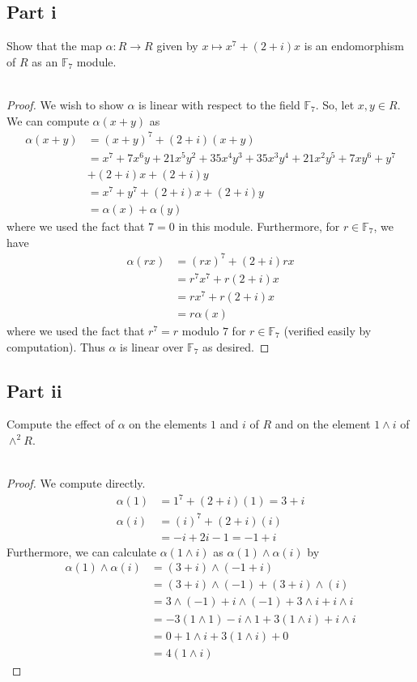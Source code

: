 \documentclass[12pt,reqno]{amsart}
\begin{document}
\subsection*{Part i}
Show that the map $\alpha:R\to R$ given by $x\mapsto x^7 + (2+i)x$ is an
endomorphism of $R$ as an $\mathbb{F}_7$ module.
\\
\\
\begin{proof}
    We wish to show $\alpha$ is linear with respect to the field $\mathbb{F}_7$.
    So, let $x,y\in R$. We can compute $\alpha(x+y)$ as
    \[
\begin{aligned}
    \alpha(x+y) &= (x+y)^7 + (2+i)(x+y)\\
    &= x^7+7x^6y+21x^5y^2+35x^4y^3+35x^3y^4+21x^2y^5+7xy^6+y^7\\
    &+(2+i)x+(2+i)y\\
    &= x^7 + y^7 + (2+i)x+(2+i)y\\
    &=\alpha(x) + \alpha(y)
\end{aligned}
    \]
    where we used the fact that $7=0$ in this module. Furthermore, for
    $r\in\mathbb{F}_7$, we have
    \[
\begin{aligned}
    \alpha(rx) &= (rx)^7 + (2+i)rx\\
    &= r^7x^7 + r(2+i)x\\
    &= rx^7 + r(2+i)x\\
    &=r\alpha(x)
\end{aligned}
    \]
    where we used the fact that $r^7 = r$ modulo $7$ for $r\in \mathbb{F}_7$
    (verified easily by computation). Thus $\alpha$ is linear over
    $\mathbb{F}_7$ as desired.
\end{proof}

\subsection*{Part ii}
Compute the effect of $\alpha$ on the elements $1$ and $i$ of $R$ and on the
element $1\wedge i$ of $\wedge^2R$.
\\
\\
\begin{proof}
    We compute directly.
    \[
        \begin{aligned}
            \alpha(1) &= 1^7 + (2+i)(1) = 3+i\\
            \alpha(i) &= (i)^7 + (2+i)(i)\\
            &= -i + 2i-1 = -1 +i
    \end{aligned}
    \]
    Furthermore, we can calculate $\alpha(1\wedge i)$ as $\alpha(1)\wedge
    \alpha(i)$ by
    \[
\begin{aligned}
    \alpha(1)\wedge\alpha(i) &= (3+i)\wedge(-1+i)\\
    &=(3+i)\wedge(-1) + (3+i)\wedge(i)\\
    &= 3\wedge(-1) + i\wedge(-1) + 3\wedge i + i\wedge i\\
    &= -3(1\wedge 1) -i\wedge 1 + 3(1\wedge i) + i\wedge i\\
    &= 0 + 1\wedge i + 3(1\wedge i) + 0\\
    &= 4(1\wedge i)
\end{aligned}
    \]
\end{proof}
\end{document}
